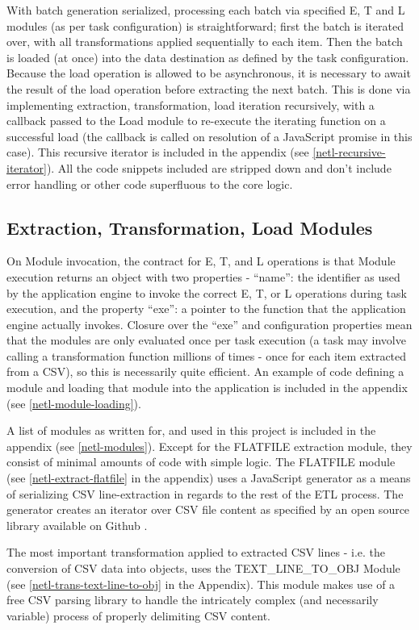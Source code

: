 With batch generation serialized, processing each batch via specified E, T and L modules (as per task configuration) is straightforward; first the batch is iterated over, with all transformations applied sequentially to each item. Then the batch is loaded (at once) into the data destination as defined by the task configuration. Because the load operation is allowed to be asynchronous, it is necessary to await the result of the load operation before extracting the next batch. This is done via implementing extraction, transformation, load iteration recursively, with a callback passed to the Load module to re-execute the iterating function on a successful load (the callback is called on resolution of a JavaScript promise in this case). This recursive iterator is included in the appendix (see \ref{netl-recursive-iterator}). All the code snippets included are stripped down and don't include error handling or other code superfluous to the core logic.

\subsection{Extraction, Transformation, Load Modules}
On Module invocation, the contract for E, T, and L operations is that Module execution returns an object with two properties - ``name'': the identifier as used by the application engine to invoke the correct E, T, or L operations during task execution, and the property ``exe'': a pointer to the function that the application engine actually invokes. Closure over the ``exe'' and configuration properties mean that the modules are only evaluated once per task execution (a task may involve calling a transformation function millions of times - once for each item extracted from a CSV), so this is necessarily quite efficient. An example of code defining a module and loading that module into the application is included in the appendix (see \ref{netl-module-loading}).

A list of modules as written for, and used in this project is included in the appendix (see \ref{netl-modules}). Except for the FLATFILE extraction module, they consist of minimal amounts of code with simple logic. The FLATFILE module (see \ref{netl-extract-flatfile} in the appendix) uses a JavaScript generator as a means of serializing CSV line-extraction in regards to the rest of the ETL process. The generator creates an iterator over CSV file content as specified by an open source library available on Github \cite{bower16}.

The most important transformation applied to extracted CSV lines - i.e. the conversion of CSV data into objects, uses the TEXT\_LINE\_TO\_OBJ Module (see \ref{netl-trans-text-line-to-obj} in the Appendix). This module makes use of a free CSV parsing library \cite{csvParse} to handle the intricately complex (and necessarily variable) process of properly delimiting CSV content.

